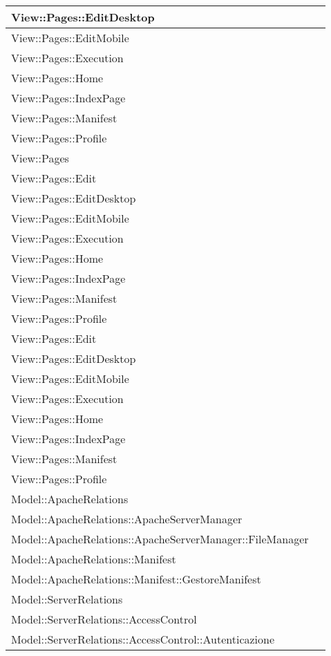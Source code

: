 {\begin{longtable} [c]{| p{7cm} | p{5cm} |}
 \hline 
View::Pages::EditDesktop & \\ 
 \hline 
View::Pages::EditMobile & \\ 
 \hline 
View::Pages::Execution & \\ 
 \hline 
View::Pages::Home & \\ 
 \hline 
View::Pages::IndexPage & \\ 
 \hline 
View::Pages::Manifest & \\ 
 \hline 
View::Pages::Profile & \\ 
 \hline 
View::Pages & \\ 
 \hline 
View::Pages::Edit & \\ 
 \hline 
View::Pages::EditDesktop & \\ 
 \hline 
View::Pages::EditMobile & \\ 
 \hline 
View::Pages::Execution & \\ 
 \hline 
View::Pages::Home & \\ 
 \hline 
View::Pages::IndexPage & \\ 
 \hline 
View::Pages::Manifest & \\ 
 \hline 
View::Pages::Profile & \\ 
 \hline 
View::Pages::Edit & \\ 
 \hline 
View::Pages::EditDesktop & \\ 
 \hline 
View::Pages::EditMobile & \\ 
 \hline 
View::Pages::Execution & \\ 
 \hline 
View::Pages::Home & \\ 
 \hline 
View::Pages::IndexPage & \\ 
 \hline 
View::Pages::Manifest & \\ 
 \hline 
View::Pages::Profile & \\ 
 \hline 
Model::ApacheRelations & \\ 
 \hline 
Model::ApacheRelations::ApacheServerManager & \\ 
 \hline 
Model::ApacheRelations::ApacheServerManager::FileManager & \\ 
 \hline 
Model::ApacheRelations::Manifest & \\ 
 \hline 
Model::ApacheRelations::Manifest::GestoreManifest & \\ 
 \hline 
Model::ServerRelations & \\ 
 \hline 
Model::ServerRelations::AccessControl & \\ 
 \hline 
Model::ServerRelations::AccessControl::Autenticazione & \\ 
 \hline 

\end{longtable}}
